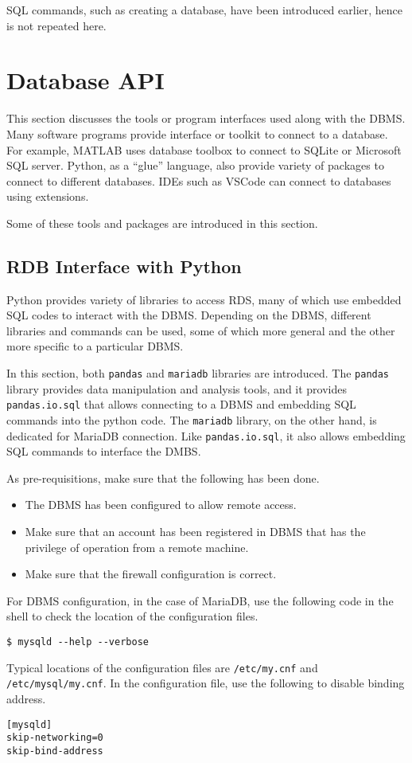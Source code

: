 SQL commands, such as creating a database, have been introduced earlier, hence is not repeated here.

\section{Database API}

This section discusses the tools or program interfaces used along with the DBMS. Many software programs provide interface or toolkit to connect to a database. For example, MATLAB uses database toolbox to connect to SQLite or Microsoft SQL server. Python, as a ``glue'' language, also provide variety of packages to connect to different databases. IDEs such as VSCode can connect to databases using extensions.

Some of these tools and packages are introduced in this section.

\subsection{RDB Interface with Python}

Python provides variety of libraries to access RDS, many of which use embedded SQL codes to interact with the DBMS. Depending on the DBMS, different libraries and commands can be used, some of which more general and the other more specific to a particular DBMS.

In this section, both \verb|pandas| and \verb|mariadb| libraries are introduced. The \verb|pandas| library provides data manipulation and analysis tools, and it provides \verb|pandas.io.sql| that allows connecting to a DBMS and embedding SQL commands into the python code. The \verb|mariadb| library, on the other hand, is dedicated for MariaDB connection. Like \verb|pandas.io.sql|, it also allows embedding SQL commands to interface the DMBS.

As pre-requisitions, make sure that the following has been done.
\begin{itemize}
	\item The DBMS has been configured to allow remote access.
	\item Make sure that an account has been registered in DBMS that has the privilege of operation from a remote machine.
	\item Make sure that the firewall configuration is correct.
\end{itemize}

For DBMS configuration, in the case of MariaDB, use the following code in the shell to check the location of the configuration files.
\begin{lstlisting}
$ mysqld --help --verbose
\end{lstlisting}
Typical locations of the configuration files are \verb|/etc/my.cnf| and \verb|/etc/mysql/my.cnf|. In the configuration file, use the following to disable binding address.
\begin{lstlisting}
[mysqld]
skip-networking=0
skip-bind-address
\end{lstlisting}

